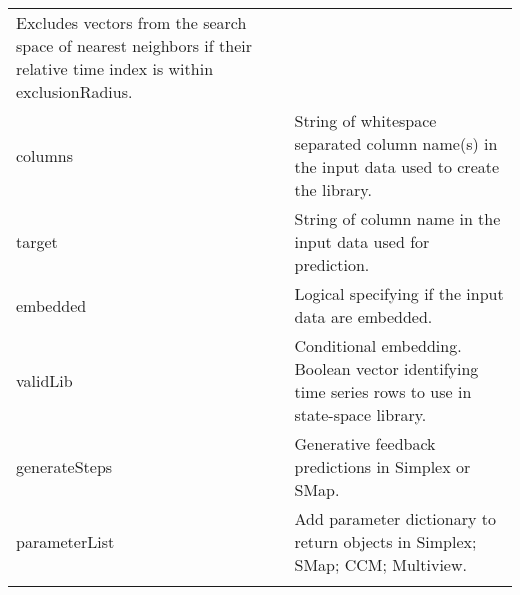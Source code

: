 \documentclass[]{article}
\begin{document}
\begin{longtable}[]{@{}ll@{}}
\begin{minipage}[t]{0.85\columnwidth}
Excludes vectors from the search space of nearest neighbors if their
relative time index is within exclusionRadius.\strut
\end{minipage}\tabularnewline
\begin{minipage}[t]{0.09\columnwidth}\raggedright
columns\strut
\end{minipage} & \begin{minipage}[t]{0.85\columnwidth}\raggedright
String of whitespace separated column name(s) in the input data used to
create the library.\strut
\end{minipage}\tabularnewline
\begin{minipage}[t]{0.09\columnwidth}\raggedright
target\strut
\end{minipage} & \begin{minipage}[t]{0.85\columnwidth}\raggedright
String of column name in the input data used for prediction.\strut
\end{minipage}\tabularnewline
\begin{minipage}[t]{0.09\columnwidth}\raggedright
embedded\strut
\end{minipage} & \begin{minipage}[t]{0.85\columnwidth}\raggedright
Logical specifying if the input data are embedded.\strut
\end{minipage}\tabularnewline
\begin{minipage}[t]{0.09\columnwidth}\raggedright
validLib\strut
\end{minipage} & \begin{minipage}[t]{0.85\columnwidth}\raggedright
Conditional embedding. Boolean vector identifying time series rows to
use in state-space library.\strut
\end{minipage}\tabularnewline
\begin{minipage}[t]{0.09\columnwidth}\raggedright
generateSteps\strut
\end{minipage} & \begin{minipage}[t]{0.85\columnwidth}\raggedright
Generative feedback predictions in Simplex or SMap.\strut
\end{minipage}\tabularnewline
\begin{minipage}[t]{0.09\columnwidth}\raggedright
parameterList\strut
\end{minipage} & \begin{minipage}[t]{0.85\columnwidth}\raggedright
Add parameter dictionary to return objects in Simplex; SMap; CCM;
Multiview.\strut
\end{minipage}\tabularnewline
\begin{minipage}[t]{0.09\columnwidth}\raggedright

\end{minipage}
\end{longtable}
\end{document}
